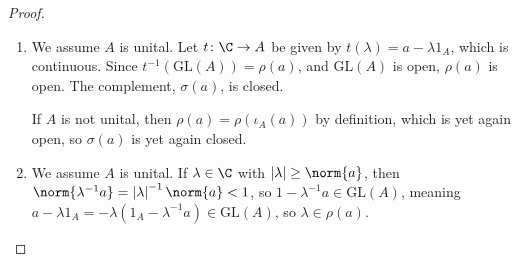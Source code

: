 \documentclass[10pt]{mypackage}
\newcommand{\GL}{\text{GL}}
\begin{document}
\begin{proof}\hfill
  \begin{enumerate}[(1)]
    \item We assume $A$ is unital. Let $t\colon \C\rightarrow A$ be given by $t\left(\lambda\right) = a - \lambda 1_A$, which is continuous. Since $t^{-1}\left(\GL\left(A\right)\right) = \rho\left(a\right)$, and $\GL\left(A\right)$ is open, $\rho\left(a\right)$ is open. The complement, $\sigma\left(a\right)$, is closed.\newline

      If $A$ is not unital, then $\rho\left(a\right) = \rho\left(\iota_A\left(a\right)\right)$ by definition, which is yet again open, so $\sigma\left(a\right)$ is yet again closed.
    \item We assume $A$ is unital. If $\lambda\in \C$ with $\left\vert \lambda \right\vert\geq \norm{a}$, then $\norm{\lambda^{-1}a} = \left\vert \lambda \right\vert^{-1}\norm{a} < 1$, so $1-\lambda^{-1}a\in \GL\left(A\right)$, meaning $a - \lambda 1_A = -\lambda\left(1_A - \lambda^{-1}a\right) \in \GL\left(A\right)$, so $\lambda\in \rho\left(a\right)$.\newline


\end{enumerate}
\end{proof}
\end{document}
